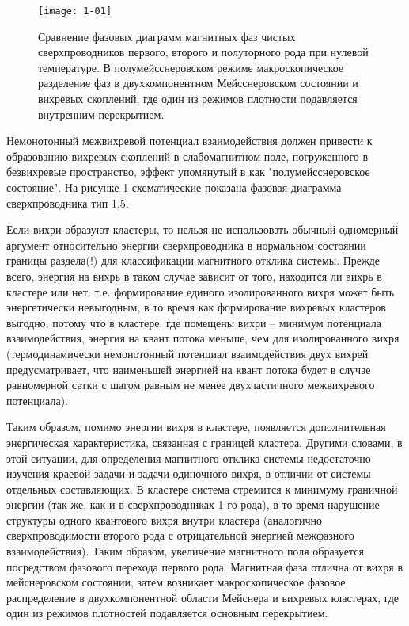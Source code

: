 \begin{figure}[h!]
  \center
  \texttt{[image: 1-01]}
  \caption{Сравнение фазовых диаграмм магнитных фаз чистых сверхпроводников
    первого, второго и полуторного рода при нулевой температуре. В 
    полумейсснеровском режиме макроскопическое разделение фаз в 
    двухкомпонентном Мейсснеровском состоянии и вихревых скоплений, где один 
    из режимов плотности подавляется внутренним перекрытием.}
  \label{fig:1}
\end{figure}

Немонотонный межвихревой потенциал взаимодействия должен привести к 
образованию вихревых скоплений в слабомагнитном поле, погруженного в 
безвихревые пространство, эффект упомянутый в \cite{bib:1} как 
"полумейсснеровское состояние". На рисунке \ref{fig:1} схематические показана 
фазовая диаграмма сверхпроводника тип 1,5.

Если вихри образуют кластеры, то нельзя не использовать обычный одномерный 
аргумент относительно энергии сверхпроводника в нормальном состоянии границы 
раздела(!) для классификации магнитного отклика системы. Прежде всего, энергия 
на вихрь в таком случае зависит от того, находится ли вихрь в кластере или 
нет: т.е. формирование единого изолированного вихря может быть энергетически 
невыгодным, в то время как формирование вихревых кластеров выгодно, потому что 
в кластере, где помещены вихри -- минимум потенциала взаимодействия, энергия 
на квант потока меньше, чем для изолированного вихря (термодинамически 
немонотонный потенциал взаимодействия двух вихрей предусматривает, что 
наименьшей энергией на квант потока будет в случае равномерной сетки с шагом 
равным не менее двухчастичного межвихревого потенциала).

Таким образом, помимо энергии вихря в кластере, появляется дополнительная 
энергическая характеристика, связанная с границей кластера. Другими словами, в 
этой ситуации, для определения магнитного отклика системы недостаточно 
изучения краевой задачи и задачи одиночного вихря, в отличии от системы 
отдельных составляющих. В кластере система стремится к минимуму граничной 
энергии (так же, как и в сверхпроводниках 1-го рода), в то время нарушение 
структуры одного квантового вихря внутри кластера (аналогично 
сверхпроводимости второго рода с отрицательной энергией межфазного 
взаимодействия). Таким образом, увеличение магнитного поля образуется 
посредством фазового перехода первого рода. Магнитная фаза отлична от вихря в 
мейснеровском состоянии, затем возникает макроскопическое фазовое 
распределение в двухкомпонентной области Мейснера и вихревых кластерах, где 
один из режимов плотностей подавляется основным перекрытием.\cite{bib:main}

\newpage